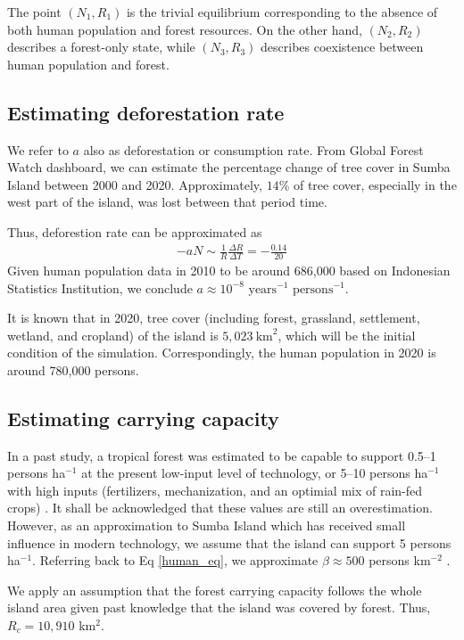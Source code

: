 \documentclass{style}
\begin{document}
The point $(N_1, R_1)$ is the trivial equilibrium corresponding to the absence of both human population and forest resources. On the other hand, $(N_2, R_2)$ describes a forest-only state, while $(N_3, R_3)$ describes coexistence between human population and forest.

\subsection{Estimating deforestation rate}
We refer to $a$ also as deforestation or consumption rate. From Global Forest Watch dashboard, we can estimate the percentage change of tree cover in Sumba Island between 2000 and 2020. Approximately, $14\%$ of tree cover, especially in the west part of the island, was lost between that period time. 

Thus, deforestion rate can be approximated as
\begin{align*}
   -aN \sim \frac{1}{R} \frac{\Delta R}{\Delta T} = -\frac{0.14}{20}
\end{align*}
Given human population data in 2010 to be around 686,000 based on Indonesian Statistics Institution, we conclude $a \approx 10^{-8} \text{ years}^{-1} \text{ persons}^{-1}$.

It is known that in 2020, tree cover (including forest, grassland, settlement, wetland, and cropland) of the island is $5,023 \:\text{km}^{2}$, which will be the initial condition of the simulation. Correspondingly, the human population in 2020 is around 780,000 persons.

\subsection{Estimating carrying capacity}
In a past study, a tropical forest was estimated to be capable to support 0.5--1 persons ha${}^{-1}$ at the present low-input level of technology, or 5--10 persons ha${}^{-1}$ with high inputs (fertilizers, mechanization, and an optimial mix of rain-fed crops) \cite{fearnside1990}. It shall be acknowledged that these values are still an overestimation. However, as an approximation to Sumba Island which has received small influence in modern technology, we assume that the island can support 5 persons ha${}^{-1}$. Referring back to Eq \eqref{human_eq}, we approximate $\beta \approx 500$ persons km${}^{-2}$ .

We apply an assumption that the forest carrying capacity follows the whole island area given past knowledge that the island was covered by forest. Thus, $R_c = 10,910$ km${}^{2}$.
\end{document}
